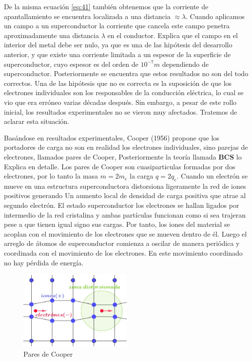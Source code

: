 De la misma ecuación \ref{eq:41} también obtenemos que la corriente de apantallamiento se encuentra localizada a una distancia $\approx \lambda$. Cuando aplicamos un campo a un superconductor la corriente que cancela este campo penetra aproximadamente una distancia $\lambda$ en el conductor. Explica que el campo en el interior del metal debe ser nulo, ya que es una de las hipótesis del desarrollo anterior, y que existe una corriente limitada a un espesor de la superficie de superconductor, cuyo espesor es del orden de $10^{−7}m$ dependiendo de superconductor. Posteriormente se encuentra que estos resultados no son del todo correctos. Una de las hipótesis que no es correcta es la suposición de que los electrones individuales son los responsables de la conducción eléctrica, lo cual se vio que era erróneo varias décadas después. Sin embargo, a pesar de este rollo inicial, los resultados experimentales no se vieron muy afectados. Tratemos de aclarar esta situación.

Basándose en resultados experimentales, Cooper (1956) propone que los portadores de carga no son en realidad los electrones individuales, sino parejas de electrones, llamados pares de Cooper, Posteriormente la teoría llamada \textbf{BCS} lo Explica en detalle. Los pares de Cooper son cuasiparticulas formadas por dos electrones, por lo tanto la masa $m=2m_{e}$ la carga $q=2q_{e}$. Cuando un electrón se mueve en una estructura superconductora distorsiona ligeramente la red de iones positivos generando Un aumento local de densidad de carga positiva que atrae al segundo electrón. El estado superconductor los electrones se hallan ligados por intermedio de la red cristalina y ambas partículas funcionan como si sea trajeran pese a que tienen igual signo sus cargas. Por tanto, los iones del material se acoplan con el movimiento de los electrones que se mueven dentro de él. Luego el arreglo de átomos de superconductor comienza a oscilar de manera periódica y coordinada con el movimiento de los electrones. En este movimiento coordinado no hay pérdida de energía.

\begin{figure}[H]
    \centering
    \includegraphics[width=0.5\textwidth]{./Figures/fig435}
	\caption{Pares de Cooper}
	\label{fig:435}
\end{figure}


